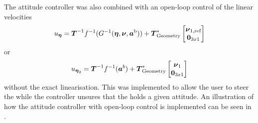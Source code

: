 The attitude controller was also combined with an open-loop control of the linear velocities
\begin{equation}
	u_{\etaVector} = \boldsymbol{T}^{-1}f^{-1}(G^{-1}(\etaVector,\nuVector,\accVector^{\text{b}})) + \thrusterGeometryOnes[*] \begin{bmatrix} \nuVector_{1,\text{ref}} \\ \zeroCol{3} \end{bmatrix}
\end{equation}
or
\begin{equation}
	u_{\etaVectorAng} = \boldsymbol{T}^{-1}f^{-1}(\accVector^b) + \thrusterGeometryOnes[*] \begin{bmatrix} \nuVectorLin \\ \zeroCol{3} \end{bmatrix}
\end{equation}
without the exact linearisation. This was implemented to allow the user to steer the \abbrROV while the controller unsures that the \abbrROV holds a given attitude. An illustration of how the attitude controller with open-loop control is implemented can be seen in .


